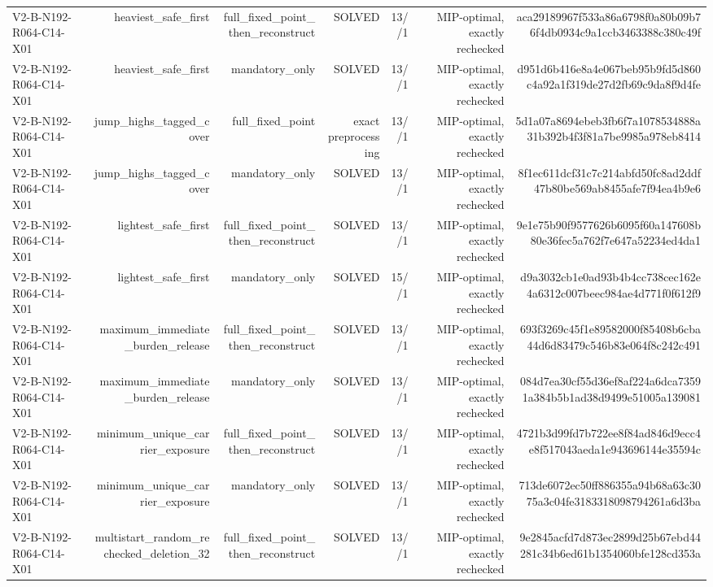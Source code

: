 {\begin{longtable}{lrrrrrr}
V2-B-N192-R064-C14-X01 & heaviest\_safe\_first & full\_fixed\_point\_then\_reconstruct & SOLVED & 13//1 & MIP-optimal, exactly rechecked & aca29189967f533a86a6798f0a80b09b76f4db0934c9a1ccb3463388c380c49f \\
V2-B-N192-R064-C14-X01 & heaviest\_safe\_first & mandatory\_only & SOLVED & 13//1 & MIP-optimal, exactly rechecked & d951d6b416e8a4e067beb95b9fd5d860c4a92a1f319de27d2fb69c9da8f9d4fe \\
V2-B-N192-R064-C14-X01 & jump\_highs\_tagged\_cover & full\_fixed\_point & exact preprocessing & 13//1 & MIP-optimal, exactly rechecked & 5d1a07a8694ebeb3fb6f7a1078534888a31b392b4f3f81a7be9985a978eb8414 \\
V2-B-N192-R064-C14-X01 & jump\_highs\_tagged\_cover & mandatory\_only & SOLVED & 13//1 & MIP-optimal, exactly rechecked & 8f1ec611dcf31c7c214abfd50fc8ad2ddf47b80be569ab8455afe7f94ea4b9e6 \\
V2-B-N192-R064-C14-X01 & lightest\_safe\_first & full\_fixed\_point\_then\_reconstruct & SOLVED & 13//1 & MIP-optimal, exactly rechecked & 9e1e75b90f9577626b6095f60a147608b80e36fec5a762f7e647a52234ed4da1 \\
V2-B-N192-R064-C14-X01 & lightest\_safe\_first & mandatory\_only & SOLVED & 15//1 & MIP-optimal, exactly rechecked & d9a3032cb1e0ad93b4b4cc738cec162e4a6312c007beec984ae4d771f0f612f9 \\
V2-B-N192-R064-C14-X01 & maximum\_immediate\_burden\_release & full\_fixed\_point\_then\_reconstruct & SOLVED & 13//1 & MIP-optimal, exactly rechecked & 693f3269c45f1e89582000f85408b6cba44d6d83479c546b83e064f8c242c491 \\
V2-B-N192-R064-C14-X01 & maximum\_immediate\_burden\_release & mandatory\_only & SOLVED & 13//1 & MIP-optimal, exactly rechecked & 084d7ea30cf55d36ef8af224a6dca73591a384b5b1ad38d9499e51005a139081 \\
V2-B-N192-R064-C14-X01 & minimum\_unique\_carrier\_exposure & full\_fixed\_point\_then\_reconstruct & SOLVED & 13//1 & MIP-optimal, exactly rechecked & 4721b3d99fd7b722ee8f84ad846d9ecc4e8f517043aeda1e943696144e35594c \\
V2-B-N192-R064-C14-X01 & minimum\_unique\_carrier\_exposure & mandatory\_only & SOLVED & 13//1 & MIP-optimal, exactly rechecked & 713de6072ec50ff886355a94b68a63c3075a3c04fe3183318098794261a6d3ba \\
V2-B-N192-R064-C14-X01 & multistart\_random\_rechecked\_deletion\_32 & full\_fixed\_point\_then\_reconstruct & SOLVED & 13//1 & MIP-optimal, exactly rechecked & 9e2845acfd7d873ec2899d25b67ebd44281c34b6ed61b1354060bfe128cd353a \\

\end{longtable}}
